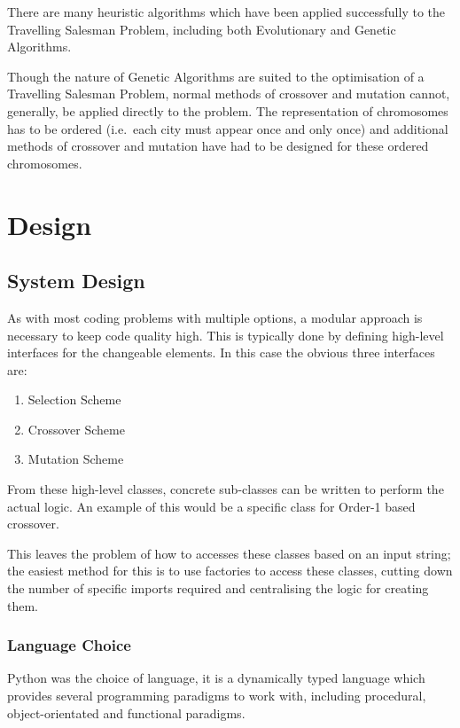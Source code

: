 \documentclass[10pt, a4paper]{article}
\begin{document}
There are many heuristic algorithms which have been applied successfully to the
Travelling Salesman Problem, including both Evolutionary and Genetic 
Algorithms.

Though the nature of Genetic Algorithms are suited to the optimisation of a
Travelling Salesman Problem, normal methods of crossover and mutation cannot,
generally, be applied directly to the problem. The representation of 
chromosomes has to be ordered (i.e.\ each city must appear once and only once)
and additional methods of crossover and mutation have had to be designed for
these ordered chromosomes.

\newpage
\section{Design}

\subsection{System Design}
As with most coding problems with multiple options, a modular approach is
necessary to keep code quality high. This is typically done by defining
high-level interfaces for the changeable elements. In this case the obvious
three interfaces are:

\begin{enumerate}
\item Selection Scheme
\item Crossover Scheme
\item Mutation Scheme
\end{enumerate}

From these high-level classes, concrete sub-classes can be written to perform
the actual logic. An example of this would be a specific class for Order-1
based crossover.

This leaves the problem of how to accesses these classes based on an input
string; the easiest method for this is to use factories to access these 
classes, cutting down the number of specific imports required and centralising
the logic for creating them.



\subsubsection{Language Choice}
Python was the choice of language, it is a dynamically typed language which 
provides several programming paradigms to work with, including procedural,
object-orientated and functional paradigms.
\end{document}
